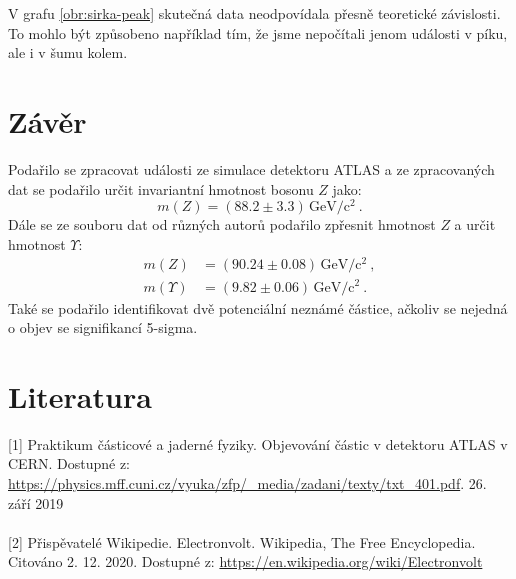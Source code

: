 \documentclass[10pt,a4paper]{article}
\renewcommand{\U}[1]{\ensuremath{\,\mathrm{#1}}}
\newcommand{\°}{\degree}
\begin{document}
V grafu \ref{obr:sirka-peak} skutečná data neodpovídala přesně teoretické závislosti. To mohlo být způsobeno například tím, že jsme nepočítali jenom události v píku, ale i v šumu kolem.

\vspace{3.2cm}

\pagebreak

\section{Závěr}
Podařilo se zpracovat události ze simulace detektoru ATLAS a ze zpracovaných dat se podařilo určit invariantní hmotnost bosonu $Z$ jako:
\begin{equation*}
    m(Z) = (88.2 \pm 3.3) \U{GeV/c^2} \: .
\end{equation*}
Dále se ze souboru dat od různých autorů podařilo zpřesnit hmotnost $Z$ a určit hmotnost $\Upsilon$:
\begin{align*}
    m(Z) &= (90.24 \pm 0.08) \U{GeV/c^2} \: , \\
    m(\Upsilon) &= (9.82 \pm 0.06) \U{GeV/c^2} \: .
\end{align*}
Také se podařilo identifikovat dvě potenciální neznámé částice, ačkoliv se nejedná o objev se signifikancí 5-sigma.



\section{Literatura}
[1] Praktikum částicové a jaderné fyziky. Objevování částic v detektoru ATLAS v CERN. Dostupné z: \url{https://physics.mff.cuni.cz/vyuka/zfp/_media/zadani/texty/txt_401.pdf}. 26. září 2019
\\\\
{}[2] Přispěvatelé Wikipedie. Electronvolt. Wikipedia, The Free Encyclopedia. Citováno 2. 12. 2020. Dostupné z: \url{https://en.wikipedia.org/wiki/Electronvolt}
\end{document}
